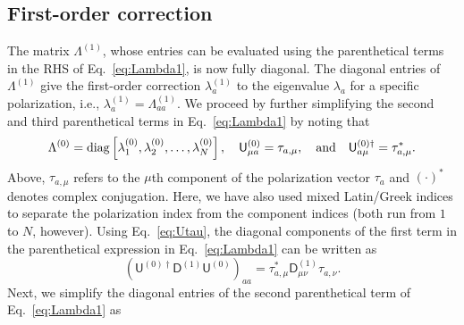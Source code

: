 \subsection{First-order correction}

The matrix $\Lambda^{(1)}$, whose entries can be evaluated using the parenthetical terms in the RHS of Eq.~\eqref{eq:Lambda1}, is now fully diagonal.
The diagonal entries of $\Lambda^{(1)}$ give the first-order correction $\lambda_{a}^{(1)}$ to the eigenvalue $\lambda_{a}$ for a specific polarization, i.e., $\lambda_{a}^{(1)} = \Lambda^{(1)}_{aa}$.
We proceed by further simplifying the second and third parenthetical terms in Eq.~\eqref{eq:Lambda1} by noting that
%
\begin{equation}
  \Lambda^{(0)} = \operatorname{diag}\left[\lambda^{(0)}_{1}, \lambda^{(0)}_{2}, \ldots, \lambda^{(0)}_{N}\right],
  \quad
  \mathsf{U}^{(0)}_{\mu a} = \tau_{a, \mu},
  \quad\text{and}\quad
  \mathsf{U}^{(0)\dagger}_{a \mu} = \tau^{*}_{a, \mu}.
  \label{eq:Utau}
\end{equation}
%
Above, $\tau_{a, \mu}$ refers to the $\mu$th component of the polarization vector $\tau_{a}$ and $(\cdot)^{*}$ denotes complex conjugation.
Here, we have also used mixed Latin/Greek indices to separate the polarization index from the component indices (both run from $1$ to $N$, however).
Using Eq.~\eqref{eq:Utau}, the diagonal components of the first term in the parenthetical expression in Eq.~\eqref{eq:Lambda1} can be written as
%
\begin{equation}
\left(\mathsf{U}^{(0)\dagger}\mathsf{D}^{(1)}\mathsf{U}^{(0)}\right)_{aa} = \tau_{a,\mu}^{*}\mathsf{D}^{(1)}_{\mu\nu}\tau_{a,\nu}.
\label{eq:1st_term}
\end{equation}
%
Next, we simplify the diagonal entries of the second parenthetical term of Eq.~\eqref{eq:Lambda1} as
%
